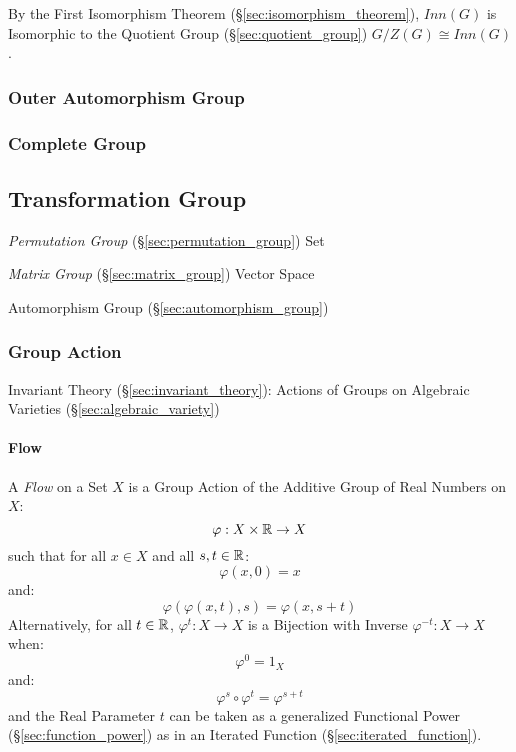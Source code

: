 By the First Isomorphism Theorem (\S\ref{sec:isomorphism_theorem}),
$Inn(G)$ is Isomorphic to the Quotient Group
(\S\ref{sec:quotient_group}) $G / Z(G) \cong Inn(G)$.



\subsubsection{Outer Automorphism Group}\label{sec:outer_automorphism_group}

\subsubsection{Complete Group}\label{sec:complete_group}



\subsection{Transformation Group}\label{sec:transformation_group}

\emph{Permutation Group} (\S\ref{sec:permutation_group}) Set

\emph{Matrix Group} (\S\ref{sec:matrix_group}) Vector Space

Automorphism Group (\S\ref{sec:automorphism_group})



\subsubsection{Group Action}\label{sec:group_action}

Invariant Theory (\S\ref{sec:invariant_theory}): Actions of Groups on
Algebraic Varieties (\S\ref{sec:algebraic_variety})



\paragraph{Flow}\label{sec:flow}\hfill

A \emph{Flow} on a Set $X$ is a Group Action of the Additive Group of Real
Numbers on $X$:
\[
  \varphi : X \times \mathbb{R} \rightarrow X
\]
such that for all $x \in X$ and all $s,t \in \mathbb{R}$:
\[
  \varphi(x,0) = x
\]
and:
\[
  \varphi(\varphi(x,t),s) = \varphi(x,s+t)
\]
Alternatively, for all $t \in \mathbb{R}$, $\varphi^t : X \rightarrow X$ is a
Bijection with Inverse $\varphi^{-t} : X \rightarrow X$ when:
\[
  \varphi^0 = 1_X
\]
and:
\[
  \varphi^s \circ \varphi^t = \varphi^{s + t}
\]
and the Real Parameter $t$ can be taken as a generalized Functional Power
(\S\ref{sec:function_power}) as in an Iterated Function
(\S\ref{sec:iterated_function}).

